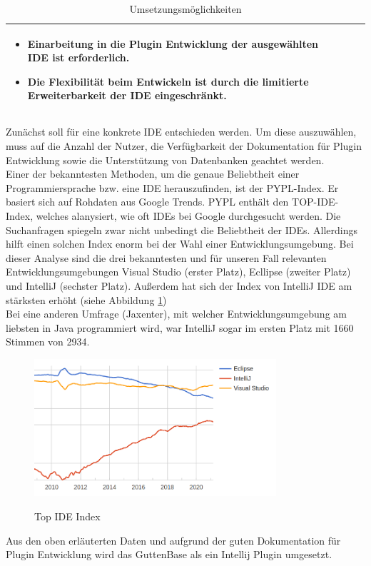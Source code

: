 \begin{table}
\begin{tabular}{ |p{3cm}|p{6cm}|p{6cm}| }
			\begin{itemize}
				\item Einarbeitung in die Plugin Entwicklung der ausgewählten IDE ist erforderlich.
				\item Die Flexibilität beim Entwickeln ist durch die limitierte Erweiterbarkeit der IDE eingeschränkt.
			\end{itemize} \\
			\hline
		
		\end{tabular}
	\caption{Umsetzungsmöglichkeiten}
	\label{table:tool-options}
\end{table}

Zunächst soll für eine konkrete IDE entschieden werden. Um diese auszuwählen, muss auf die Anzahl der Nutzer, die Verfügbarkeit der Dokumentation für Plugin Entwicklung sowie die Unterstützung von Datenbanken geachtet werden.\\
Einer der bekanntesten Methoden, um die genaue Beliebtheit einer Programmiersprache bzw. eine IDE herauszufinden, ist der PYPL-Index. Er basiert sich auf Rohdaten aus Google Trends. PYPL enthält den TOP-IDE-Index, welches alanysiert, wie oft IDEs bei Google durchgesucht werden. Die Suchanfragen spiegeln zwar nicht unbedingt die Beliebtheit der IDEs. Allerdings hilft einen solchen Index enorm bei der Wahl einer Entwicklungsumgebung.
Bei dieser Analyse sind die drei bekanntesten und für unseren Fall relevanten Entwicklungsumgebungen Visual Studio (erster Platz), Ecllipse (zweiter Platz) und IntelliJ (sechster Platz). Außerdem hat sich der Index von IntelliJ IDE am stärksten erhöht (siehe Abbildung \ref{img:ide-index})\\
Bei eine anderen Umfrage (Jaxenter), mit welcher Entwicklungsumgebung am liebsten in Java programmiert wird, war IntelliJ sogar im ersten Platz mit 1660 Stimmen von 2934. \\

\begin{figure}[H]
	\caption{Top IDE Index}
	\centering
	\includegraphics[width=0.8\textwidth]{images/ide-index}
	\label{img:ide-index}
\end{figure}
Aus den oben erläuterten Daten und aufgrund der guten Dokumentation für Plugin Entwicklung wird das GuttenBase als ein Intellij Plugin umgesetzt. 



